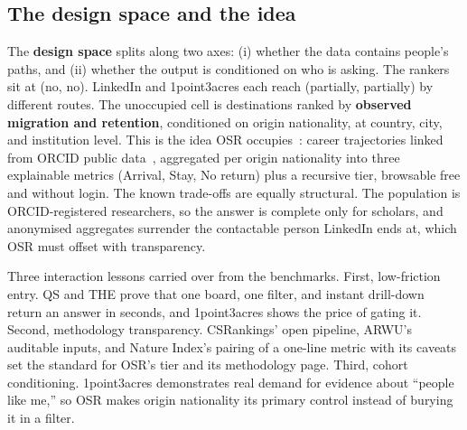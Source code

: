 \subsection{The design space and the idea}

The \textbf{design space} splits along two axes: (i) whether the data contains people's paths, and (ii) whether the output is conditioned on who is asking. The rankers sit at (no, no). LinkedIn and 1point3acres each reach (partially, partially) by different routes. The unoccupied cell is destinations ranked by \textbf{observed migration and retention}, conditioned on origin nationality, at country, city, and institution level. This is the idea OSR occupies~\cite{osr}: career trajectories linked from ORCID public data~\cite{orcid2025}, aggregated per origin nationality into three explainable metrics (Arrival, Stay, No return) plus a recursive tier, browsable free and without login. The known trade-offs are equally structural. The population is ORCID-registered researchers, so the answer is complete only for scholars, and anonymised aggregates surrender the contactable person LinkedIn ends at, which OSR must offset with transparency.

Three interaction lessons carried over from the benchmarks. First, low-friction entry. QS and THE prove that one board, one filter, and instant drill-down return an answer in seconds, and 1point3acres shows the price of gating it. Second, methodology transparency. CSRankings' open pipeline, ARWU's auditable inputs, and Nature Index's pairing of a one-line metric with its caveats set the standard for OSR's tier and its methodology page. Third, cohort conditioning. 1point3acres demonstrates real demand for evidence about ``people like me,'' so OSR makes origin nationality its primary control instead of burying it in a filter.
